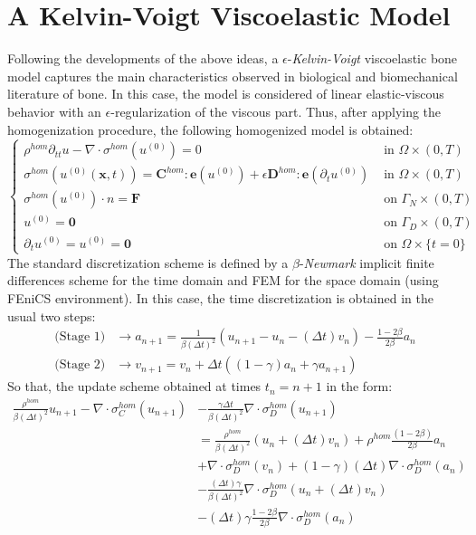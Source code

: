 \section{A Kelvin-Voigt Viscoelastic Model}
Following the developments of the above ideas, a $\epsilon$-\textit{Kelvin-Voigt} viscoelastic bone model captures the main characteristics observed in biological and biomechanical literature of bone. In this case, the model is considered of linear elastic-viscous behavior with an $\epsilon$-regularization of the viscous part.
Thus, after applying the homogenization procedure, the following homogenized model is obtained:
\begin{equation*}
    \left \{
    \begin{array}{cc}
        \rho^{hom} \partial_{tt} u - \nabla \cdot \sigma^{hom}(u^{(0)}) = 0 & \text{ in } \Omega \times (0,T) \\
        \sigma^{hom}(u^{(0)}(\mathbf{x},t)) =  \mathbf{C}^{hom}:\mathbf{e}(u^{(0)}) + \epsilon \mathbf{D}^{hom}:\mathbf{e}(\partial_{t}u^{(0)}) & \text{ in }\Omega \times (0,T)\\
        \sigma^{hom}(u^{(0)})\cdot n = \mathbf{F} & \text{ on }\Gamma_N\times (0,T) \\
        u^{(0)} = \mathbf{0} & \text{ on }\Gamma_D \times (0,T) \\
    \partial_t u^{(0)} = u^{(0)} = \mathbf{0} &  \text{ on } \Omega \times \{t=0\}
    \end{array}
    \right .
\end{equation*}
The standard discretization scheme is defined by a $\beta$-\textit{Newmark} implicit finite differences scheme for the time domain and FEM for the space domain (using FEniCS environment). In this case, the time discretization is obtained in the usual two steps:
\begin{align*}
    \text{(Stage 1)} &\longrightarrow a_{n+1} = \frac{1}{\beta (\Delta t)^2} (u_{n+1}-u_{n}-(\Delta t)v_n) - \frac{1-2\beta}{2\beta}a_n\\
    \text{(Stage 2)}& \longrightarrow v_{n+1} = v_n + \Delta t((1-\gamma)a_n + \gamma a_{n+1})
\end{align*}
So that, the update scheme obtained at times $t_n = n+1$ in the form:
\begin{align*}
    \frac{\rho^{hom}}{\beta (\Delta t)^2} u_{n+1} - \nabla \cdot \sigma_C^{hom}( u_{n+1})  & - \frac{\gamma \Delta t}{\beta (\Delta t)^2} \nabla \cdot \sigma_D^{hom}(u_{n+1}) \\
    &= \frac{\rho^{hom}}{\beta (\Delta t)^2} (u_n + (\Delta t)v_n) + \rho^{hom}\frac{ (1-2\beta)}{2\beta} a_n \\
    & + \nabla \cdot \sigma_D^{hom}(v_n) + (1-\gamma)(\Delta t) \nabla\cdot \sigma_D^{hom}(a_n) \\
    & - \frac{(\Delta t)\gamma}{\beta (\Delta t)^2}\nabla \cdot \sigma_D^{hom}(u_n + (\Delta t)v_n) \\
    & - (\Delta t)\gamma\frac{1-2\beta}{2 \beta} \nabla \cdot \sigma_D^{hom}(a_n)
\end{align*}

